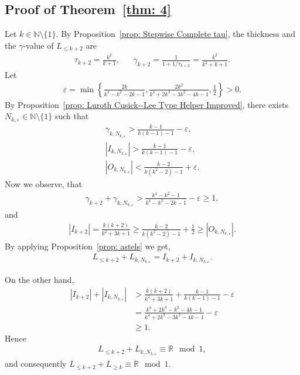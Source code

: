 \documentclass{ws-ijnt}
\begin{document}
	\subsection{Proof of Theorem~\ref{thm: 4}}
	Let $k\in\mathbb{N}\setminus\{1\}$. By Proposition~\ref{prop: Stepwise Complete tau}, the thickness and the $\gamma$-value of $L_{\leq k+2}$ are
	\begin{align*}
		\tau_{k+2}=\frac{k^2}{k+1}, && \gamma_{k+2}=\frac{1}{1+1/\tau_{k+2}}=\frac{k^2}{k^2+k+1}.
	\end{align*}
	Let
	\begin{align*}
		\varepsilon
		=\min{\left\{\frac{2k}{k^4-k^2-2 k-1},\frac{2k^2}{k^4+2k^3-3k^2-4k-1},\frac{1}{2}\right\}}
		>0.
	\end{align*}
	By Proposition~\ref{prop: Luroth Cusick--Lee Type Helper Improved}, there exists $N_{k,\varepsilon}\in\mathbb{N}\setminus\{1\}$ such that
	\begin{align*}
		\gamma_{k,N_{k,\varepsilon}}>\frac{k-1}{k(k-1)-1}-\varepsilon, \\
		\left\lvert{I_{k,N_{k,\varepsilon}}}\right\rvert>\frac{k-1}{k(k-1)-1}-\varepsilon, \\
		\left\lvert{O_{k,N_{k,\varepsilon}}}\right\rvert<\frac{k-2}{k(k^2-2)-1}+\varepsilon.
	\end{align*}
	Now we observe, that
	\begin{align*}
		\gamma_{k+2}+\gamma_{k,N_{k,\varepsilon}}
		>\frac{k^4-k^2-1}{k^4-k^2-2 k-1}-\varepsilon
		\geq1,
	\end{align*}
	and
	\begin{align*}
		\left\lvert{I_{k+2}}\right\rvert=\frac{k (k+2)}{k^2+3 k+1}\geq\frac{k-2}{k(k^2-2)-1}+\frac{1}{2}\geq\left\lvert{O_{k,N_{k,\varepsilon}}}\right\rvert.
	\end{align*}
	By applying Proposition~\ref{prop: astels} we get,
	\begin{align*}
		L_{\leq k+2}+L_{k,N_{k,\varepsilon}}=I_{k+2}+I_{k,N_{k,\varepsilon}}.
	\end{align*}
	
	On the other hand,
	\begin{align*}
		\left\lvert{I_{k+2}}\right\rvert+\left\lvert{I_{k,N_{k,\varepsilon}}}\right\rvert
		&>\frac{k(k+2)}{k^2+3k+1}+\frac{k-1}{k(k-1)-1}-\varepsilon \\
		&=\frac{k^4+2k^3-k^2-4k-1}{k^4+2k^3-3k^2-4k-1}-\varepsilon \\
		&\geq1.
	\end{align*}
	Hence
	\begin{align*}
		L_{\leq k+2}+L_{k,N_{k,\varepsilon}}\equiv\mathbb{R}\mod1,
	\end{align*}
	and consequently $L_{\leq k+2}+L_{\geq k}\equiv\mathbb{R}\mod1$.
	
\end{document}
